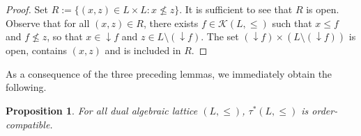 \documentclass{article}
\newtheorem{lemma}[theorem]{Lemma}
\newtheorem{proposition}[theorem]{Proposition}
\begin{document}
\begin{proof}
{Set $R:=\{(x,z) \in L \times L : x \not \le z \}$. It is sufficient to see that $R$ is open. Observe that for all $(x,z) \in R$, there exists $f \in \mathcal{K}(L,\le)$ such that $x \le f$ and $f \not \le z$, so that $x \in \mathop{\downarrow}f$ and $z \in L \setminus (\mathop{\downarrow}f)$. The set $(\mathop{\downarrow}f) \times (L \setminus (\mathop{\downarrow}f))$ is open, contains $(x,z)$ and is included in $R$.}
\end{proof}

As a consequence of the three preceding lemmas, we immediately obtain the following.


\begin{proposition}\label{proposition.lawson.dominated}
    {For all dual algebraic lattice $(L,\le)$, $\tau^*(L,\le)$ is order-compatible.}
\end{proposition}

\end{document}
